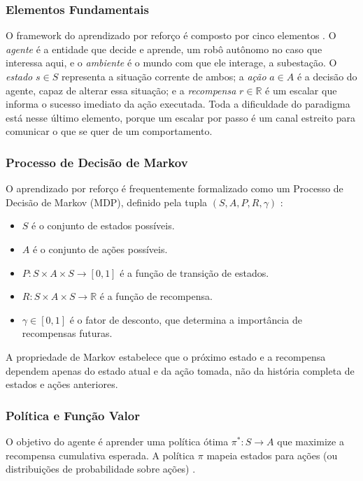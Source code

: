 \subsubsection{Elementos Fundamentais}

O framework do aprendizado por reforço é composto por cinco elementos
\cite{Sutton2018}. O \emph{agente} é a entidade que decide e aprende, um robô autônomo
no caso que interessa aqui, e o \emph{ambiente} é o mundo com que ele interage, a
subestação. O \emph{estado} $s \in S$ representa a situação corrente de ambos; a
\emph{ação} $a \in A$ é a decisão do agente, capaz de alterar essa situação; e a
\emph{recompensa} $r \in \mathbb{R}$ é um escalar que informa o sucesso imediato da ação
executada. Toda a dificuldade do paradigma está nesse último elemento, porque um escalar
por passo é um canal estreito para comunicar o que se quer de um comportamento.

\subsubsection{Processo de Decisão de Markov}

O aprendizado por reforço é frequentemente formalizado como um Processo de Decisão de Markov (MDP), definido pela tupla $(S, A, P, R, \gamma)$ \cite{Puterman2014}:

\begin{itemize}
    \item $S$ é o conjunto de estados possíveis.
    \item $A$ é o conjunto de ações possíveis.
    \item $P: S \times A \times S \rightarrow [0, 1]$ é a função de transição de estados.
    \item $R: S \times A \times S \rightarrow \mathbb{R}$ é a função de recompensa.
    \item $\gamma \in [0, 1]$ é o fator de desconto, que determina a importância de recompensas futuras.
\end{itemize}

A propriedade de Markov estabelece que o próximo estado e a recompensa dependem apenas do estado atual e da ação tomada, não da história completa de estados e ações anteriores.

\subsubsection{Política e Função Valor}

O objetivo do agente é aprender uma política ótima $\pi^*: S \rightarrow A$ que maximize a recompensa cumulativa esperada. A política $\pi$ mapeia estados para ações (ou distribuições de probabilidade sobre ações) \cite{Sutton2018}.


